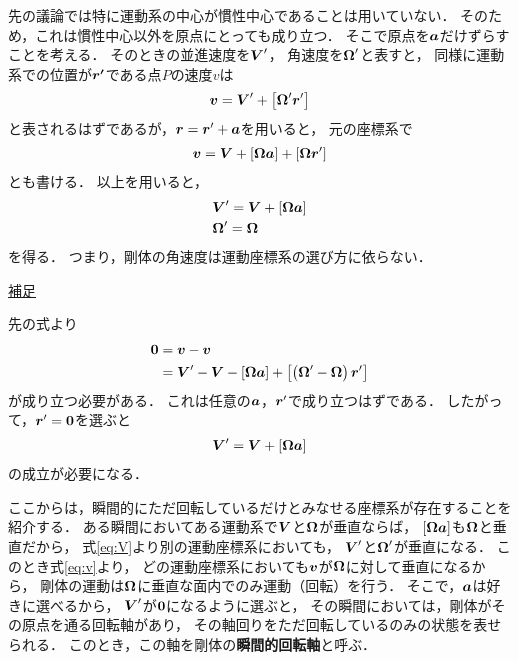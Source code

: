 \documentclass[a4paper]{jsarticle}
\def\vec#1{\mbox{\boldmath $#1$}}
\begin{document}
先の議論では特に運動系の中心が慣性中心であることは用いていない．
そのため，これは慣性中心以外を原点にとっても成り立つ．
そこで原点を$\vec{a}$だけずらすことを考える．
そのときの並進速度を$\vec{V}^{\prime}$，
角速度を$\vec{\Omega}^{\prime}$と表すと，
同様に運動系での位置が$\vec{r^{\prime}}$である点$P$の速度$v$は
\begin{align}
	\vec{v} = \vec{V}^{\prime}
	+ \left[ \vec{\Omega}^{\prime} \vec{r}^{\prime} \right]
	\label{eq:v}
\end{align}
と表されるはずであるが，$\vec{r} = \vec{r}^{\prime} + \vec{a}$を用いると，
元の座標系で
\begin{align}
	\vec{v} = \vec{V} + \left[ \vec{\Omega} \vec{a} \right]
	+ \left[ \vec{\Omega} \vec{r}^{\prime} \right]
\end{align}
とも書ける．
以上を用いると，
\begin{align}
	&\vec{V}^{\prime} = \vec{V} + \left[ \vec{\Omega} \vec{a} \right]
	\\ \label{eq:V}
	&\vec{\Omega}^{\prime} = \vec{\Omega}
\end{align}
を得る．
つまり，剛体の角速度は運動座標系の選び方に依らない．
\begin{screen}
	\underline{補足}

	先の式より
	\begin{align}
		\vec{0} &= \vec{v} - \vec{v} \\
		&= \vec{V}^{\prime} - \vec{V} - \left[ \vec{\Omega} \vec{a} \right]
		+ \left[
			\left( \vec{\Omega}^{\prime} - \vec{\Omega} \right)
			\vec{r}^{\prime}
		\right]
	\end{align}
	が成り立つ必要がある．
	これは任意の$\vec{a}$，$\vec{r}^{\prime}$で成り立つはずである．
	したがって，$\vec{r}^{\prime} = \vec{0}$を選ぶと
	\begin{align}
		\vec{V}^{\prime} = \vec{V} + \left[ \vec{\Omega} \vec{a} \right]
	\end{align}
	の成立が必要になる．
\end{screen}

ここからは，瞬間的にただ回転しているだけとみなせる座標系が存在することを紹介する．
ある瞬間においてある運動系で$\vec{V}$と$\vec{\Omega}$が垂直ならば，
$[\vec{\Omega} \vec{a}]$も$\vec{\Omega}$と垂直だから，
式\eqref{eq:V}より別の運動座標系においても，
$\vec{V}^{\prime}$と$\vec{\Omega}^{\prime}$が垂直になる．
このとき式\ref{eq:v}より，
どの運動座標系においても$\vec{v}$が$\vec{\Omega}$に対して垂直になるから，
剛体の運動は$\vec{\Omega}$に垂直な面内でのみ運動（回転）を行う．
そこで，$\vec{a}$は好きに選べるから，
$\vec{V}^{\prime}$が$\vec{0}$になるように選ぶと，
その瞬間においては，剛体がその原点を通る回転軸があり，
その軸回りをただ回転しているのみの状態を表せられる．
このとき，この軸を剛体の\textbf{瞬間的回転軸}と呼ぶ．
\end{document}
